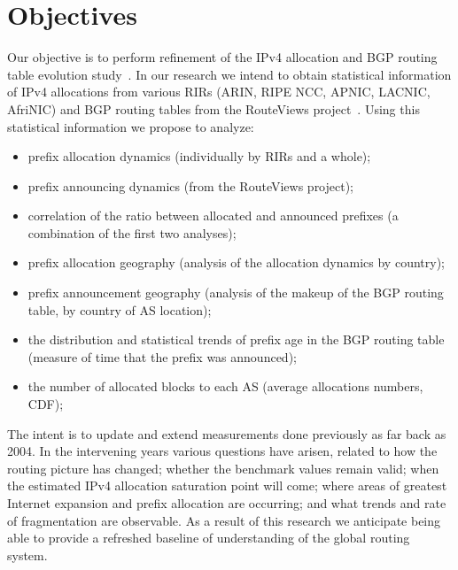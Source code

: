 \documentclass[conference]{IEEEtran}
\begin{document}
\section{Objectives}

Our objective is to perform refinement of the IPv4 allocation and BGP routing table evolution study~\cite{Meng:2005:IPv4-address}. In our research we intend to obtain statistical information of IPv4 allocations from various RIRs (ARIN, RIPE NCC, APNIC, LACNIC, AfriNIC) and BGP routing tables from the RouteViews project~\cite{::Route-Views}. Using this statistical information we propose to analyze:

\begin{itemize}
	\item prefix allocation dynamics (individually by RIRs and a whole);
	\item prefix announcing dynamics (from the RouteViews project);
	\item correlation of the ratio between allocated and announced prefixes (a combination of the first two analyses);
	\item prefix allocation geography (analysis of the allocation dynamics by country);
	\item prefix announcement geography (analysis of the makeup of the BGP routing table, by country of AS location);
	\item the distribution and statistical trends of prefix age in the BGP routing table (measure of time that the prefix was announced); 
	\item the number of allocated blocks to each AS (average allocations numbers, CDF);
\end{itemize}

The intent is to update and extend measurements done previously as far back as 2004. In the intervening years various questions have arisen, related to how the routing picture has changed; whether the benchmark values remain valid; when the estimated IPv4 allocation saturation point will come; where areas of greatest Internet expansion and prefix allocation are occurring; and what trends and rate of fragmentation are observable.  As a result of this research we anticipate being able to provide a refreshed baseline of understanding of the global routing system.
\end{document}
